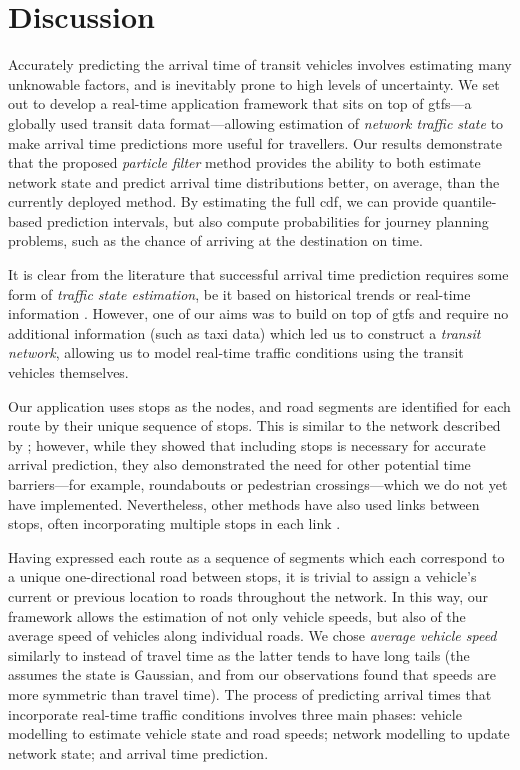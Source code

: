\chapter{Discussion}
\label{cha:discussion}


Accurately predicting the arrival time of transit vehicles involves estimating many unknowable factors, and is inevitably prone to high levels of uncertainty. We set out to develop a real-time application framework that sits on top of \gls{gtfs}---a globally used transit data format---allowing estimation of \emph{network traffic state} to make arrival time predictions more useful for travellers. Our results demonstrate that the proposed \emph{particle filter} method provides the ability to both estimate network state and predict arrival time distributions better, on average, than the currently deployed method. By estimating the full \gls{cdf}, we can provide quantile-based prediction intervals, but also compute probabilities for journey planning problems, such as the chance of arriving at the destination on time.


It is clear from the literature that successful arrival time prediction requires some form of \emph{traffic state estimation}, be it based on historical trends \citep{Julio_2016,Cathey_2003,Celan_2017,Mazloumi_2012} or real-time information \citep{Ma_2019,Xinghao_2013,Shalaby_2004}. However, one of our aims was to build on top of \gls{gtfs} and require no additional information (such as taxi data) which led us to construct a \emph{transit network}, allowing us to model real-time traffic conditions using the transit vehicles themselves.


Our application uses stops as the nodes, and road segments are identified for each route by their unique sequence of stops. This is similar to the network described by \citet{Celan_2018,Celan_2017}; however, while they showed that including stops is necessary for accurate arrival prediction, they also demonstrated the need for other potential time barriers---for example, roundabouts or pedestrian crossings---which we do not yet have implemented. Nevertheless, other methods have also used links between stops, often incorporating multiple stops in each link \citep{Shalaby_2004}.


Having expressed each route as a sequence of segments which each correspond to a unique one-directional road between stops, it is trivial to assign a vehicle's current or previous location to roads throughout the network. In this way, our framework allows the estimation of not only vehicle speeds, but also of the average speed of vehicles along individual roads. We chose \emph{average vehicle speed} similarly to \citet{Celan_2017,Celan_2018} instead of travel time \citep{Shalaby_2004,Dai_2019} as the latter tends to have long tails (the \kf{} assumes the state is Gaussian, and from our observations found that speeds are more symmetric than travel time). The process of predicting arrival times that incorporate real-time traffic conditions involves three main phases: vehicle modelling to estimate vehicle state and road speeds; network modelling to update network state; and arrival time prediction.


